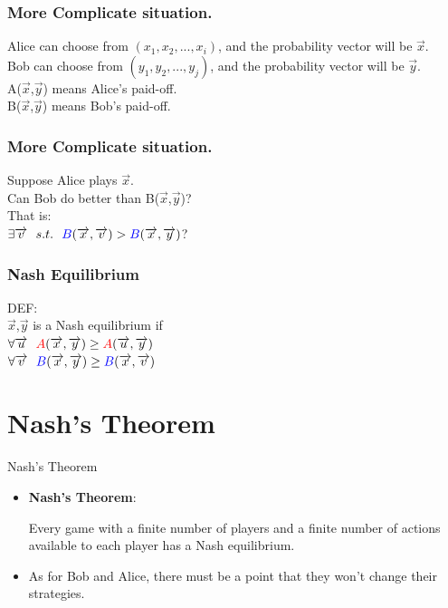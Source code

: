 \documentclass{beamer}
\begin{document}
\begin{frame}
\frametitle{More Complicate situation.}
{\color{red}Alice} can choose from $(x_1,x_2,...,x_i)$, and the probability vector will be $\overrightarrow{x}$.\\
{\color{blue}Bob} can choose from $(y_1,y_2,...,y_j)$, and the probability vector will be $\overrightarrow{y}$.\\
{\color{red}A}($\overrightarrow{x}$,$\overrightarrow{y}$) means {\color{red}Alice}'s paid-off.\\
{\color{blue}B}($\overrightarrow{x}$,$\overrightarrow{y}$) means {\color{blue}Bob}'s paid-off.\\
\end{frame}

\begin{frame}
\frametitle{More Complicate situation.}
Suppose {\color{red}Alice} plays $\overrightarrow{x}$.\\
Can {\color{blue}Bob} do better than {\color{blue}B}($\overrightarrow{x}$,$\overrightarrow{y}$)?\\
That is:\\
        \qquad $\exists \overrightarrow{v} ~~s.t. ~~{\color{blue}B}(\overrightarrow{x},\overrightarrow{v}) >{\color{blue}B}(\overrightarrow{x},\overrightarrow{y})$?
\end{frame}

\begin{frame}
\frametitle{Nash Equilibrium}
DEF:\\
\qquad $\overrightarrow{x}$,$\overrightarrow{y}$ is a Nash equilibrium if\\
\qquad $\forall \overrightarrow{u} ~~{\color{red}A}(\overrightarrow{x},\overrightarrow{y}) \geq{\color{red}A}(\overrightarrow{u},\overrightarrow{y})$\\
\qquad $\forall \overrightarrow{v} ~~{\color{blue}B}(\overrightarrow{x},\overrightarrow{y}) \geq{\color{blue}B}(\overrightarrow{x},\overrightarrow{v})$
\end{frame}


\section{Nash's Theorem}
\begin{frame}{Nash's Theorem}
	\begin{itemize}[<+->]
		\item \textbf{\large Nash's Theorem}:
		
		\qquad Every game with a finite number of players and a finite number of actions
		available to each player has a Nash equilibrium.
		\item As for Bob and Alice, there must be a point that they won't change their strategies.
	\end{itemize}
\end{frame}
\end{document}
